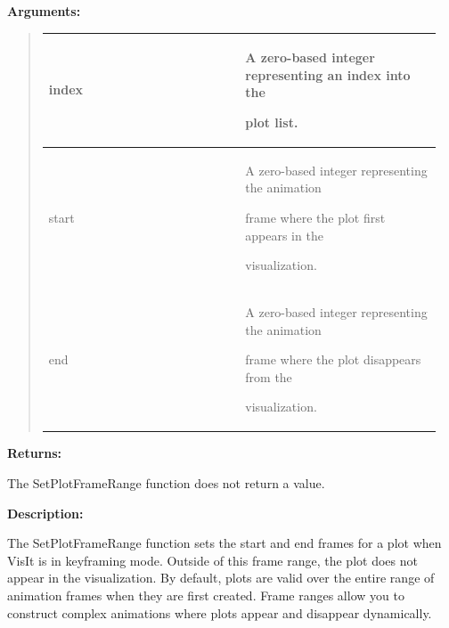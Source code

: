 \documentclass[letterpaper,10pt,english]{sphinxmanual}
\begin{document}
\begin{DUlineblock}{0em}
\item[] 
\item[] \textbf{Arguments:}
\end{DUlineblock}
\begin{quote}

\begin{tabular}{|p{0.475\linewidth}|p{0.475\linewidth}|}
\hline

index
 & 
\begin{DUlineblock}{0em}
\item[] A zero-based integer representing an index into the
\item[] plot list.
\end{DUlineblock}
\\
\hline
start
 & 
\begin{DUlineblock}{0em}
\item[] A zero-based integer representing the animation
\item[] frame where the plot first appears in the
\item[] visualization.
\end{DUlineblock}
\\
\hline
end
 & 
\begin{DUlineblock}{0em}
\item[] A zero-based integer representing the animation
\item[] frame where the plot disappears from the
\item[] visualization.
\end{DUlineblock}
\\
\hline\end{tabular}

\end{quote}

\begin{DUlineblock}{0em}
\item[] 
\item[] \textbf{Returns:}
\item[] The SetPlotFrameRange function does not return a value.
\item[] 
\item[] \textbf{Description:}
\item[] The SetPlotFrameRange function sets the start and end frames for a plot
when VisIt is in keyframing mode. Outside of this frame range, the plot
does not appear in the visualization. By default, plots are valid over the
entire range of animation frames when they are first created. Frame ranges
allow you to construct complex animations where plots appear and disappear
dynamically.
\end{DUlineblock}
\end{document}
